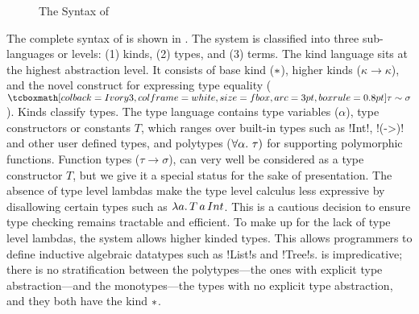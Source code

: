 \documentclass[screen,nonacm,manuscript,review]{acmart} %
\begin{document}
\begin{figure}[ht]
 \caption{The Syntax of \SFC}
 \label{fig:sfc-syntax}
\end{figure}

The complete syntax of \SFC is shown in . The
system is classified into three sub-languages or levels: (1) kinds,
(2) types, and (3) terms. The kind language sits at the highest
abstraction level. It consists of base kind ($\ast$), higher kinds
($\kappa \to \kappa$), and the novel construct for expressing type
equality ($\shl{\tau \sim \sigma}$). Kinds classify types. The type
language contains type variables ($\alpha$), type constructors or
constants $T$, which ranges over built-in types such as !Int!, !(->)!
and other user defined types, and polytypes ($\forall\alpha.~\tau)$
for supporting polymorphic functions. Function types ($\tau \to
\sigma$), can very well be considered as a type constructor $T$, but
we give it a special status for the sake of presentation. The absence
of type level lambdas make the type level calculus less expressive by
disallowing certain types such as $\lambda a.\, T\, a\, Int$. This is
a cautious decision to ensure type checking remains tractable and
efficient. To make up for the lack of type level lambdas, the system
allows higher kinded types. This allows programmers to define
inductive algebraic datatypes such as !List!s and !Tree!s. \SFC is
impredicative; there is no stratification between the polytypes---the
ones with explicit type abstraction---and
the monotypes---the types with no explicit type abstraction, and they
both have the kind $\ast$.
\end{document}
